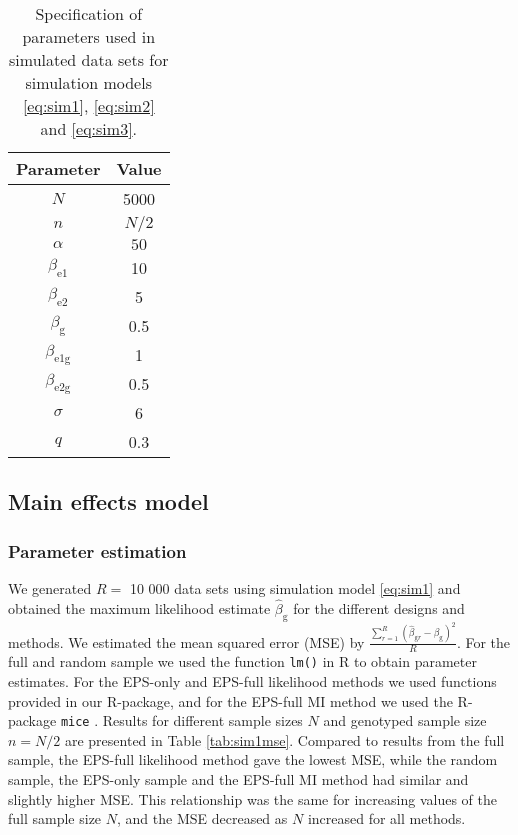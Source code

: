 \documentclass[10pt,a4paper]{article}
\begin{document}
\begin{table}[h]
\centering
\begin{tabular}{cc}
\hline
\rule{0pt}{2.5ex}
	Parameter & Value \\
	\hline
	\rule{0pt}{2.5ex}
	$N$ & 5000  \\
	$n$ & $N/2$ \\
	$\alpha$ & $50$  \\
	$\beta_{\text{e}1}$ & 10 \\
	$\beta_{\text{e}2}$ & 5 \\
	$\beta_{\text{g}}$ & 0.5  \\
	$\beta_{\text{e}1\text{g}}$ & 1  \\
	$\beta_{\text{e}2\text{g}}$ & 0.5 \\
	$\sigma$ & 6  \\
	$q$ & 0.3  \\
	\hline
\end{tabular}
\caption{Specification of parameters used in simulated data sets for simulation models \eqref{eq:sim1}, \eqref{eq:sim2} and \eqref{eq:sim3}.}
\label{tab:param}
\end{table}

\subsection{Main effects model}
\subsubsection{Parameter estimation}
We generated $R = $ 10 000 data sets using simulation model \eqref{eq:sim1} and obtained the maximum likelihood estimate $\hat{\beta}_{\text{g}}$ for the different designs and methods. We estimated the mean squared error (MSE) by $\frac{\sum_{r=1}^{R} (\hat{\beta}_{\text{g}r} - \beta_{\text{g}})^{2}}{R}$. For the full and random sample we used the function \texttt{lm()} in R to obtain parameter estimates. For the EPS-only and EPS-full likelihood methods we used functions provided in our R-package, and for the EPS-full MI method we used the R-package \texttt{mice} \citep{buuren2011mice}. Results for different sample sizes $N$ and genotyped sample size $n = N/2$ are presented in Table \ref{tab:sim1mse}. Compared to results from the full sample, the EPS-full likelihood method gave the lowest MSE, while the random sample, the EPS-only sample and the EPS-full MI method had similar and slightly higher MSE. This relationship was the same for increasing values of the full sample size $N$, and the MSE decreased as $N$ increased for all methods.
\end{document}
